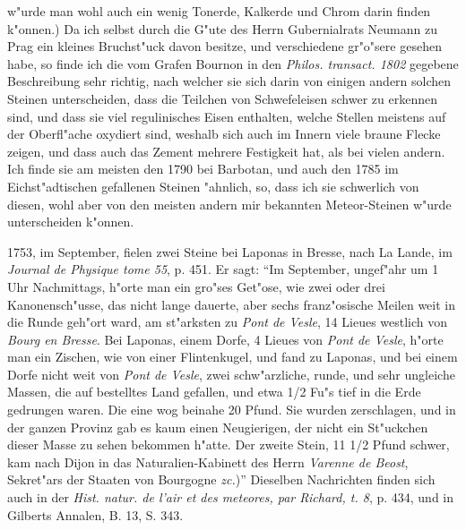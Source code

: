 \documentclass[a4paper, 11pt, oneside, polutonikogreek, german]{article}
\begin{document}
w"urde man wohl auch ein wenig Tonerde, Kalkerde und Chrom darin finden k"onnen.) Da ich selbst durch die G"ute des Herrn Gubernialrats Neumann zu Prag ein kleines Bruchst"uck davon besitze, und verschiedene gr"o"sere gesehen habe, so finde ich die vom Grafen Bournon in den \emph{Philos. transact. 1802} gegebene Beschreibung sehr richtig, nach welcher sie sich darin von einigen andern solchen Steinen unterscheiden, dass die Teilchen von Schwefeleisen schwer zu erkennen sind, und dass sie viel regulinisches Eisen enthalten, welche Stellen meistens auf der Oberfl"ache oxydiert sind, weshalb sich auch im Innern viele braune Flecke zeigen, und dass auch das Zement mehrere Festigkeit hat, als bei vielen andern. Ich finde sie am meisten den 1790 bei Barbotan, und auch den 1785 im Eichst"adtischen gefallenen Steinen "ahnlich, so, dass ich sie schwerlich von diesen, wohl aber von den meisten andern mir bekannten Meteor-Steinen w"urde unterscheiden k"onnen.

1753, im September, fielen zwei Steine bei Laponas in Bresse, nach La Lande, im \emph{Journal de Physique tome 55}, p. 451. Er sagt: "`Im September, ungef"ahr um 1 Uhr Nachmittags, h"orte man ein gro"ses Get"ose, wie zwei oder drei Kanonensch"usse, das nicht lange dauerte, aber sechs franz"osische Meilen weit in die Runde geh"ort ward, am st"arksten zu \emph{Pont de Vesle}, 14 Lieues westlich von \emph{Bourg en Bresse}. Bei Laponas, einem Dorfe, 4 Lieues von \emph{Pont de Vesle}, h"orte man ein Zischen, wie von einer Flintenkugel, und fand zu Laponas, und bei einem Dorfe nicht weit von \emph{Pont de Vesle}, zwei schw"arzliche, runde, und sehr ungleiche Massen, die auf bestelltes Land gefallen, und etwa 1/2 Fu"s tief in die Erde gedrungen waren. Die eine wog beinahe 20 Pfund. Sie wurden zerschlagen, und in der ganzen Provinz gab es kaum einen Neugierigen, der nicht ein St"uckchen dieser Masse zu sehen bekommen h"atte. Der zweite Stein, 11 1/2 Pfund schwer, kam nach Dijon in das Naturalien-Kabinett des Herrn \emph{Varenne de Beost}, Sekret"ars der Staaten von Bourgogne \emph{zc.})"' Dieselben Nachrichten finden sich auch in der \emph{Hist. natur. de l'air et des meteores, par Richard, t. 8}, p. 434, und in Gilberts Annalen, B. 13, S. 343.
\end{document}
